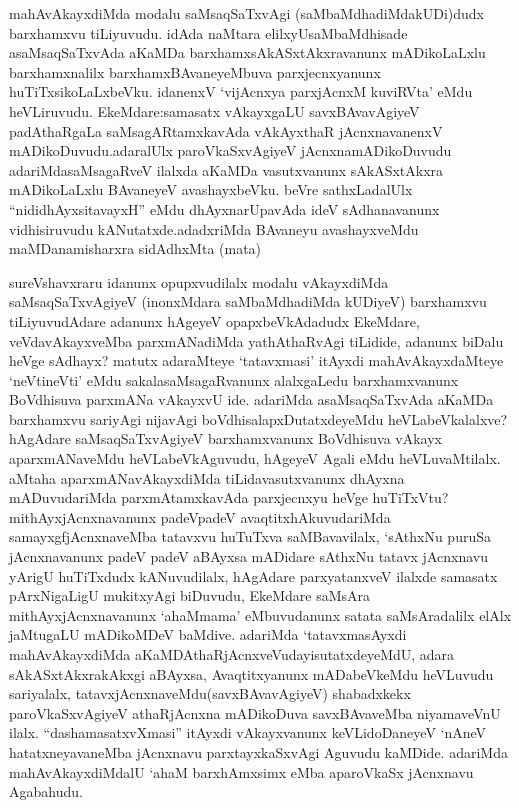 
\begin{artha}
mahAvAkayxdiMda modalu saMsaqSaTxvAgi (saMbaMdhadiMda\break kUDi)dudx barxhamxvu tiLiyuvudu. idAda naMtara elilxyU\break saMbaMdhisade asaMsaqSaTxvAda aKaMDa barxhamxsAkASxtAkxravanunx mADikoLaLxlu barxhamxnalilx barxhamxBAvaneyeMbuva parxjecnxyanunx huTiTxsikoLaLxbeVku. idanenxV `vijAcnxya parxjAcnxM kuviRVta' eMdu heVLiruvudu. EkeMdare:\ndash  samasatx vAkayxgaLU savxBAvavAgiyeV padAthaRgaLa saMsagARtamxkavAda vAkAyxthaR jAcnxnavanenxV mADikoDuvudu.\break adaralUlx paroVkaSxvAgiyeV jAcnxnamADikoDuvudu adariMda\break saMsagaRveV ilalxda aKaMDa vasutxvanunx sAkASxtAkxra mADikoLaLxlu BAvaneyeV avashayxbeVku. beVre sathxLadalUlx ``nididhAyxsitavayxH'' eMdu dhAyxnarUpavAda ideV sAdhanavanunx vidhisiruvudu kANutatxde.\break adadxriMda BAvaneyu avashayxveMdu maMDanamisharxra sidAdhxMta (mata)
\end{artha}


\begin{artha}
sureVshavxraru idanunx opupxvudilalx modalu vAkayxdiMda saMsaqSaTxvAgiyeV (inonxMdara saMbaMdhadiMda kUDiyeV) barxhamxvu tiLiyuvudAdare adanunx hAgeyeV opapxbeVkAdadudx EkeMdare, veVdavAkayxveMba parxmANadiMda yathAthaRvAgi tiLidide, adanunx biDalu heVge sAdhayx? matutx adaraMteye `tatavxmasi' itAyxdi mahAvAkayxdaMteye `neVtineVti' eMdu sakalasaMsagaRvanunx alalxgaLedu barxhamxvanunx BoVdhisuva parxmANa vAkayxvU ide. adariMda asaMsaqSaTxvAda aKaMDa barxhamxvu sariyAgi nijavAgi boVdhisalapxDutatxdeyeMdu heVLabeVkalalxve? hAgAdare saMsaqSaTxvAgiyeV barxhamxvanunx BoVdhisuva vAkayx aparxmANaveMdu heVLabeVkAguvudu, hAgeyeV Agali eMdu heVLuvaMtilalx. aMtaha aparxmANavAkayxdiMda tiLidavasutxvanunx dhAyxna mADuvudariMda parxmAtamxkavAda parxjecnxyu heVge huTiTxVtu? mithAyxjAcnxnavanunx padeVpadeV avaqtitxhAkuvudariMda samayxgfjAcnxnaveMba tatavxvu huTuTxva saMBavavilalx, `sAthxNu puruSa jAcnxnavanunx padeV padeV aBAyxsa mADidare sAthxNu tatavx jAcnxnavu yArigU huTiTxdudx kANuvudilalx, hAgAdare parxyatanxveV ilalxde samasatx pArxNigaLigU mukitxyAgi biDuvudu, EkeMdare saMsAra mithAyxjAcnxnavanunx `ahaMmama' eMbuvudanunx satata saMsAradalilx elAlx jaMtugaLU mADikoMDeV baMdive. adariMda `tatavxmasAyxdi mahAvAkayxdiMda aKaMDAthaRjAcnxveV\break udayisutatxdeyeMdU, adara sAkASxtAkxrakAkxgi aBAyxsa, Avaqtitxyanunx mADabeVkeMdu heVLuvudu sariyalalx, tatavxjAcnxnaveMdu\break (savxBAvavAgiyeV) shabadxkekx paroVkaSxvAgiyeV athaRjAcnxna mADikoDuva savxBAvaveMba niyamaveVnU ilalx. ``dashamasatxvXmasi'' itAyxdi vAkayxvanunx keVLidoDaneyeV `nAneV hatatxneyavaneMba jAcnxnavu parxtayxkaSxvAgi Aguvudu kaMDide. adariMda mahAvAkayxdiMdalU `ahaM barxhAmxsimx eMba aparoVkaSx jAcnxnavu Agabahudu. 
\end{artha}

